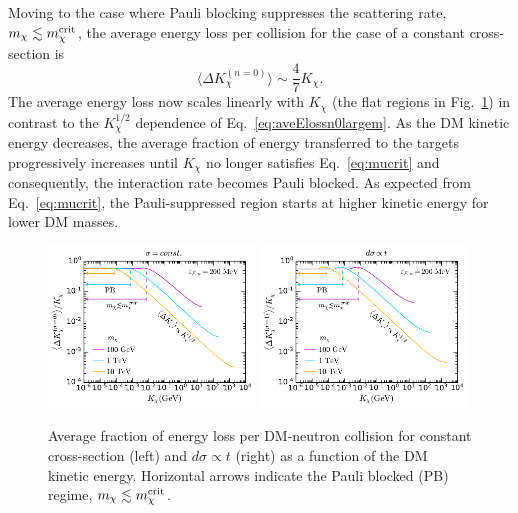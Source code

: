 Moving to the case where Pauli blocking suppresses the scattering rate, $m_\chi\lesssim m_\chi^{\rm crit}$, the average energy loss per collision for the case of a constant cross-section is
\begin{equation}
\langle \Delta K_\chi^{(n=0)} \rangle \sim 
\frac{4}{7}K_\chi. 
\label{eq:aveElossn0}
\end{equation}
The average energy loss now scales linearly with $K_\chi$ (the flat regions in Fig.~\ref{fig:Taven0}) in contrast to the $K_\chi^{1/2}$ dependence of Eq.~\ref{eq:aveElossn0largem}.
As the DM kinetic energy decreases, the average fraction of energy transferred to the targets progressively increases until $K_\chi$ no longer satisfies Eq.~\ref{eq:mucrit} and consequently, the interaction rate becomes Pauli blocked.
As expected from Eq.~\ref{eq:mucrit}, the Pauli-suppressed region starts at higher kinetic energy for lower DM masses. 


\begin{figure}
  \centering
  \includegraphics[width=0.49\textwidth]{q0ave_Tdm.pdf}
  \includegraphics[width=0.49\textwidth]{q0ave_Tdm_n1.pdf}
  \caption{Average fraction of energy loss per DM-neutron collision for constant cross-section (left) and $d\sigma\propto t$ (right) as a function of the DM kinetic energy. Horizontal arrows indicate the Pauli blocked (PB) regime, $m_\chi\lesssim m_\chi^{\rm crit}$. 
  } 
  \label{fig:Taven0}
\end{figure}




